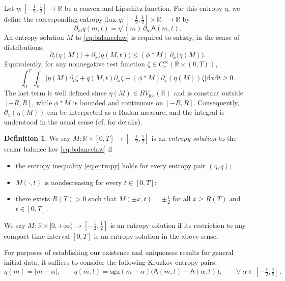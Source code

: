 \documentclass[11pt,reqno]{amsart}
\theoremstyle{definition}
\newtheorem{definition}{Definition}[section]
\theoremstyle{remark}
\def\R{\mathbb{R}}
\def\dd{\mathrm{d}}
\def\pa{\partial}
\def\loc{\mathrm{loc}}
\def\A{\mathsf{A}}
\newcommand{\sgn}[1]{\mathrm{sgn}(#1)}
\begin{document}
	Let $\eta:[-\tfrac12,\tfrac12]\to \R$ be a convex and Lipschitz function. For this entropy $\eta$, we define the corresponding entropy flux $q:[-\tfrac12,\tfrac12]\times \R_+\to \R$ by
	\[
	\pa_m q(m,t) = \eta'(m)\, \pa_m \A(m,t).
	\]
	An entropy solution $M$ to \eqref{eq:balancelaw} is required to satisfy, in the sense of distributions,
	\begin{equation} \label{eq:entropy}
		\pa_t\big(\eta(M)\big) + \pa_x\big(q(M,t)\big) \le (\phi\ast M)\,\pa_x\big(\eta(M)\big).
	\end{equation}
	Equivalently, for any nonnegative test function $\zeta\in C_c^\infty(\R\times (0,T))$,
	\begin{equation} \label{eq:entropydist}
		\int_0^{T} \int_\R \Big[\eta(M) \pa_t \zeta + q(M,t)\pa_x \zeta 
		+ (\phi\ast M)\pa_x (\eta(M))\zeta \Big] \dd x \dd t \ge 0.
	\end{equation}
	The last term is well defined since $\eta(M)\in BV_{\loc}(\R)$ and is constant outside $[-R,R]$, while $\phi*M$ is bounded and continuous on $[-R,R]$. Consequently, $\pa_x(\eta(M))$ can be interpreted as a Radon measure, and the integral is understood in the usual sense (cf. \cite{leslie2023sticky} for details).
	
	\begin{definition}
			We say $M : \R \times [0,T] \to [-\frac12,\frac12]$ is an \emph{entropy solution} to the scalar balance law \eqref{eq:balancelaw} if
		\begin{itemize}
			\item the entropy inequality \eqref{eq:entropy} holds for every entropy pair $(\eta,q)$;
			\item $M(\cdot,t)$ is nondecreasing for every $t\in[0,T]$;
			\item there exists $R(T)>0$ such that $M(\pm x,t)=\pm\frac12$ for all $x\ge R(T)$ and $t\in[0,T]$.
		\end{itemize}
		We say $M : \R \times [0,+\infty) \to [-\frac12,\frac12]$ is an entropy solution if its restriction to any compact time interval $[0,T]$ is an entropy solution in the above sense.
	\end{definition}
	
	For purposes of establishing our existence and uniqueness results for general initial data, it suffices to consider the following Kruzkov entropy pairs:
	\begin{equation}
		\label{eq:Kruzkovpair}
		\eta(m) = |m - \alpha|, \qquad 
		q(m,t) = \sgn{m - \alpha}\big(\A(m,t) - \A(\alpha,t)\big), \qquad
		\forall~\alpha\in [-\tfrac12,\tfrac12].
	\end{equation}
	
\end{document}
